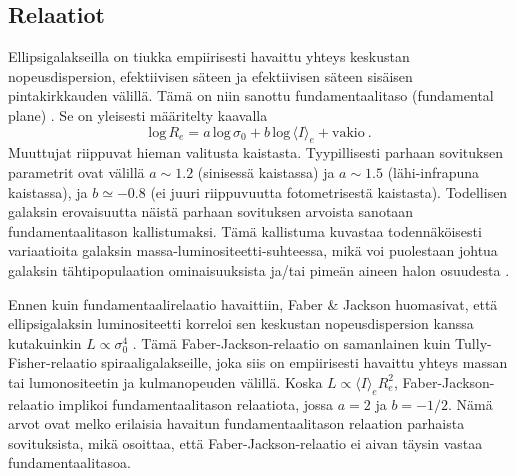 \documentclass[12pt,a4paper]{article}
\begin{document}
\subsection{Relaatiot}

Ellipsigalakseilla on tiukka empiirisesti havaittu yhteys keskustan nopeusdispersion, efektiivisen säteen ja efektiivisen säteen sisäisen pintakirkkauden välillä. Tämä on niin sanottu fundamentaalitaso (fundamental plane) \citep{djorgovski:1987, dressler:1987}. Se on yleisesti määritelty kaavalla
\begin{equation} \label{fundamentaalitaso}
 \mathrm{log} \, R_e = a \, \mathrm{log} \, \sigma_0 + b \, \mathrm{log} \, \langle I \rangle_e + \mathrm{vakio} \ .
\end{equation}
Muuttujat riippuvat hieman valitusta kaistasta. Tyypillisesti parhaan sovituksen parametrit ovat välillä $a \sim 1.2$ (sinisessä kaistassa) ja $a \sim 1.5$ (lähi-infrapuna kaistassa), ja $b \simeq -0.8$ (ei juuri riippuvuutta fotometrisestä kaistasta). Todellisen galaksin erovaisuutta näistä parhaan sovituksen arvoista sanotaan fundamentaalitason kallistumaksi. Tämä kallistuma kuvastaa todennäköisesti variaatioita galaksin massa-luminositeetti-suhteessa, mikä voi puolestaan johtua galaksin tähtipopulaation ominaisuuksista ja/tai pimeän aineen halon osuudesta \citep{capellari:2006}.

Ennen kuin fundamentaalirelaatio havaittiin, Faber \& Jackson huomasivat, että ellipsigalaksin luminositeetti korreloi sen keskustan nopeusdispersion kanssa kutakuinkin $L \propto \sigma^4_0$ \citep{faber-jackson:1976}. Tämä Faber-Jackson-relaatio on samanlainen kuin Tully-Fisher-relaatio spiraaligalakseille, joka siis on empiirisesti havaittu yhteys massan tai lumonositeetin ja kulmanopeuden välillä. Koska $L \propto \langle I \rangle_e R^2_e$, Faber-Jackson-relaatio implikoi fundamentaalitason relaatiota, jossa $a = 2$ ja $b = -1/2$. Nämä arvot ovat melko erilaisia havaitun fundamentaalitason relaation parhaista sovituksista, mikä osoittaa, että Faber-Jackson-relaatio ei aivan täysin vastaa fundamentaalitasoa.
\end{document}
